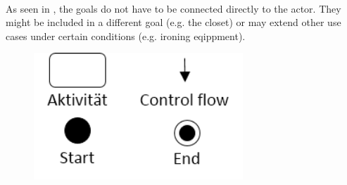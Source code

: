 \paragraph{} As seen in , the goals do not have to be connected directly to the actor. They might be included in a different goal (e.g. the closet) or may extend other use cases under certain conditions (e.g. ironing eqippment).

\begin{figure}[H] 
    \begin{minipage}[m]{.5\linewidth}
        \centering
        \includegraphics[width=0.7\textwidth]{img/adSymb.png}
        \label{fig:adSymb}
    \end{minipage}%
    \begin{minipage}[m]{.5\linewidth}
        \centering

\end{minipage}
\end{figure}
